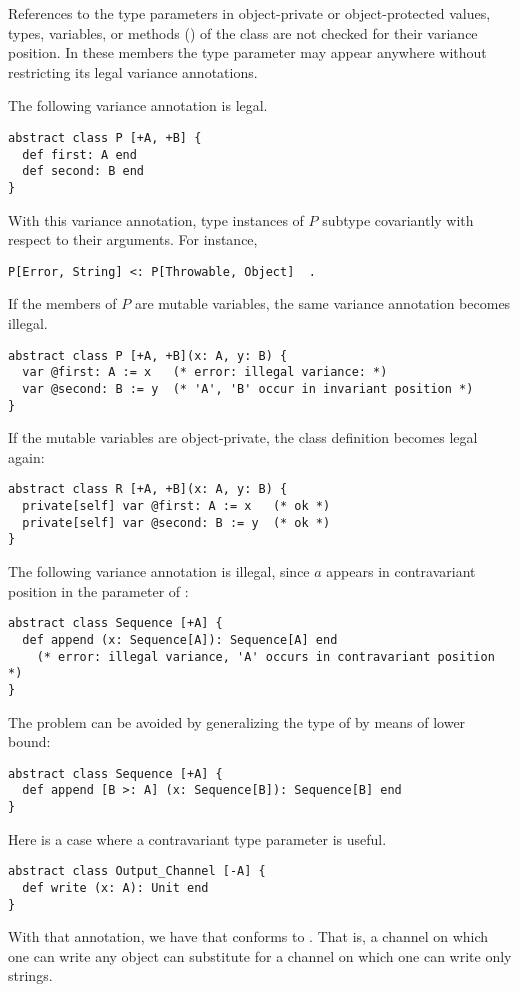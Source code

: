 References to the type parameters in object-private or object-protected values, types, variables, or methods () of the class are not checked for their variance position. In these members the type parameter may appear anywhere without restricting its legal variance annotations. 

\example The following variance annotation is legal. 
\begin{lstlisting}
abstract class P [+A, +B] {
  def first: A end
  def second: B end
}
\end{lstlisting}
With this variance annotation, type instances of $P$ subtype covariantly with respect to their arguments. For instance, 
\begin{lstlisting}
P[Error, String] <: P[Throwable, Object]  .
\end{lstlisting}
If the members of $P$ are mutable variables, the same variance annotation becomes illegal. 
\begin{lstlisting}
abstract class P [+A, +B](x: A, y: B) {
  var @first: A := x   (* error: illegal variance: *)
  var @second: B := y  (* 'A', 'B' occur in invariant position *)
}
\end{lstlisting}
If the mutable variables are object-private, the class definition becomes legal again: 
\begin{lstlisting}
abstract class R [+A, +B](x: A, y: B) {
  private[self] var @first: A := x   (* ok *)
  private[self] var @second: B := y  (* ok *)
}
\end{lstlisting}

\example The following variance annotation is illegal, since $a$ appears in contravariant position in the parameter of :
\begin{lstlisting}
abstract class Sequence [+A] {
  def append (x: Sequence[A]): Sequence[A] end
    (* error: illegal variance, 'A' occurs in contravariant position *)
}
\end{lstlisting}
The problem can be avoided by generalizing the type of  by means of lower bound:
\begin{lstlisting}
abstract class Sequence [+A] {
  def append [B >: A] (x: Sequence[B]): Sequence[B] end
}
\end{lstlisting}

\example Here is a case where a contravariant type parameter is useful. 
\begin{lstlisting}
abstract class Output_Channel [-A] {
  def write (x: A): Unit end
}
\end{lstlisting}
With that annotation, we have that  conforms to . That is, a channel on which one can write any object can substitute for a channel on which one can write only strings. 




